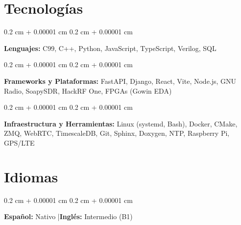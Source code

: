 \documentclass[10pt, letterpaper]{article}
\newenvironment{onecolentry}{
    \begin{adjustwidth}{
        0.2 cm + 0.00001 cm
    }{
        0.2 cm + 0.00001 cm
    }
}{
    \end{adjustwidth}
} %
\begin{document}
        \vspace{0.2 cm}
    
    \section{Tecnologías}

        \begin{onecolentry}
            \textbf{Lenguajes:} C99, C++, Python, JavaScript, TypeScript, Verilog, SQL
        \end{onecolentry}

        \vspace{0.2 cm}

        \begin{onecolentry}
            \textbf{Frameworks y Plataformas:} FastAPI, Django, React, Vite, Node.js, GNU Radio, SoapySDR, HackRF One, FPGAs (Gowin EDA)
        \end{onecolentry}

        \vspace{0.2 cm}

        \begin{onecolentry}
            \textbf{Infraestructura y Herramientas:} Linux (systemd, Bash), Docker, CMake, ZMQ, WebRTC, TimescaleDB, Git, Sphinx, Doxygen, NTP, Raspberry Pi, GPS/LTE
        \end{onecolentry}

    \section{Idiomas}

        \begin{onecolentry}
            \textbf{Español:} Nativo \quad|\quad \textbf{Inglés:} Intermedio (B1)
        \end{onecolentry}
\end{document}
